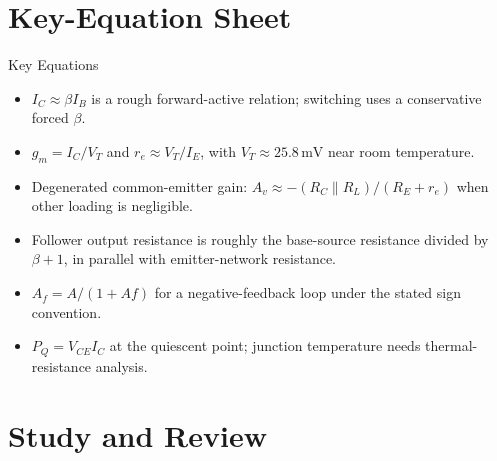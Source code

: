 \documentclass[10pt,letterpaper]{article}
\begin{document}
\section{Key-Equation Sheet}
\begin{CornellExamBox}{Key Equations}
\begin{itemize}
  \item $I_C\approx\beta I_B$ is a rough forward-active relation; switching uses a conservative forced $\beta$.
  \item $g_m=I_C/V_T$ and $r_e\approx V_T/I_E$, with $V_T\approx25.8\,\mathrm{mV}$ near room temperature.
  \item Degenerated common-emitter gain: $A_v\approx-(R_C\parallel R_L)/(R_E+r_e)$ when other loading is negligible.
  \item Follower output resistance is roughly the base-source resistance divided by $\beta+1$, in parallel with emitter-network resistance.
  \item $A_f=A/(1+Af)$ for a negative-feedback loop under the stated sign convention.
  \item $P_Q=V_{CE}I_C$ at the quiescent point; junction temperature needs thermal-resistance analysis.
\end{itemize}\end{CornellExamBox}
\section{Study and Review}
\end{document}

